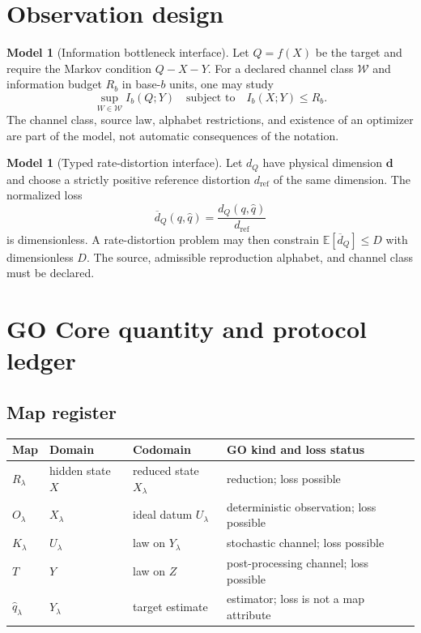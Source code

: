 \documentclass[11pt,a4paper]{article}
\theoremstyle{definition}
\newtheorem{model}[definition]{Model}
\theoremstyle{plain}
\theoremstyle{remark}
\newcommand{\E}{\mathbb{E}}
\newcommand{\1}{\mathbf{1}}
\newcommand{\Ib}{I_b}
\begin{document}
\section{Observation design}

\begin{model}[Information bottleneck interface]
Let $Q=f(X)$ be the target and require the Markov condition
$Q-X-Y$. For a declared channel class $\mathcal{W}$ and information budget
$R_b$ in base-$b$ units, one may study
\[
\sup_{W\in\mathcal{W}}\Ib(Q;Y)
\quad\text{subject to}\quad
\Ib(X;Y)\leq R_b.
\]
The channel class, source law, alphabet restrictions, and existence of an
optimizer are part of the model, not automatic consequences of the
notation.
\end{model}

\begin{model}[Typed rate-distortion interface]
Let $d_Q$ have physical dimension $\mathbf d$ and choose a strictly
positive reference distortion $d_{\mathrm{ref}}$ of the same dimension.
The normalized loss
\[
\overline d_Q(q,\widehat q)
=
\frac{d_Q(q,\widehat q)}{d_{\mathrm{ref}}}
\]
is dimensionless. A rate-distortion problem may then constrain
$\E[\overline d_Q]\leq D$ with dimensionless $D$. The source, admissible
reproduction alphabet, and channel class must be declared.
\end{model}

\section{GO Core quantity and protocol ledger}

\subsection{Map register}

\begin{center}
\small
\begin{tabularx}{\linewidth}{@{}L{30mm}L{31mm}L{31mm}Y@{}}
\toprule
Map & Domain & Codomain & GO kind and loss status\\
\midrule
$R_\lambda$ & hidden state $X$ & reduced state $X_\lambda$
& reduction; loss possible\\
$O_\lambda$ & $X_\lambda$ & ideal datum $U_\lambda$
& deterministic observation; loss possible\\
$K_\lambda$ & $U_\lambda$ & law on $Y_\lambda$
& stochastic channel; loss possible\\
$T$ & $Y$ & law on $Z$
& post-processing channel; loss possible\\
$\widehat q_\lambda$ & $Y_\lambda$ & target estimate
& estimator; loss is not a map attribute\\
\bottomrule
\end{tabularx}
\end{center}
\end{document}
